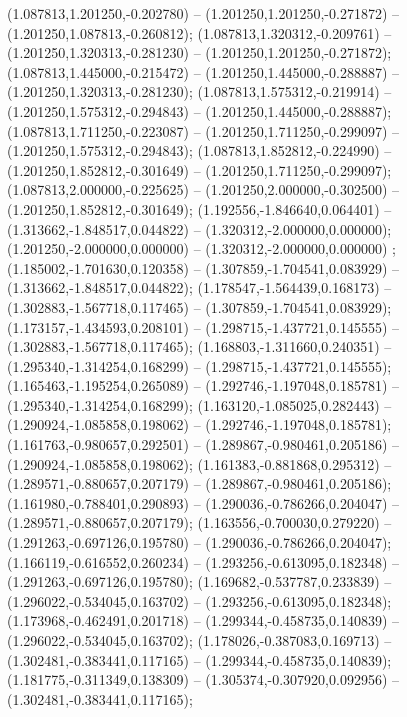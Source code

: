  (1.087813,1.201250,-0.202780) -- (1.201250,1.201250,-0.271872) -- (1.201250,1.087813,-0.260812);
 (1.087813,1.320312,-0.209761) -- (1.201250,1.320313,-0.281230) -- (1.201250,1.201250,-0.271872);
 (1.087813,1.445000,-0.215472) -- (1.201250,1.445000,-0.288887) -- (1.201250,1.320313,-0.281230);
 (1.087813,1.575312,-0.219914) -- (1.201250,1.575312,-0.294843) -- (1.201250,1.445000,-0.288887);
 (1.087813,1.711250,-0.223087) -- (1.201250,1.711250,-0.299097) -- (1.201250,1.575312,-0.294843);
 (1.087813,1.852812,-0.224990) -- (1.201250,1.852812,-0.301649) -- (1.201250,1.711250,-0.299097);
 (1.087813,2.000000,-0.225625) -- (1.201250,2.000000,-0.302500) -- (1.201250,1.852812,-0.301649);
 (1.192556,-1.846640,0.064401) -- (1.313662,-1.848517,0.044822) -- (1.320312,-2.000000,0.000000);
 (1.201250,-2.000000,0.000000) -- (1.320312,-2.000000,0.000000) ;
 (1.185002,-1.701630,0.120358) -- (1.307859,-1.704541,0.083929) -- (1.313662,-1.848517,0.044822);
 (1.178547,-1.564439,0.168173) -- (1.302883,-1.567718,0.117465) -- (1.307859,-1.704541,0.083929);
 (1.173157,-1.434593,0.208101) -- (1.298715,-1.437721,0.145555) -- (1.302883,-1.567718,0.117465);
 (1.168803,-1.311660,0.240351) -- (1.295340,-1.314254,0.168299) -- (1.298715,-1.437721,0.145555);
 (1.165463,-1.195254,0.265089) -- (1.292746,-1.197048,0.185781) -- (1.295340,-1.314254,0.168299);
 (1.163120,-1.085025,0.282443) -- (1.290924,-1.085858,0.198062) -- (1.292746,-1.197048,0.185781);
 (1.161763,-0.980657,0.292501) -- (1.289867,-0.980461,0.205186) -- (1.290924,-1.085858,0.198062);
 (1.161383,-0.881868,0.295312) -- (1.289571,-0.880657,0.207179) -- (1.289867,-0.980461,0.205186);
 (1.161980,-0.788401,0.290893) -- (1.290036,-0.786266,0.204047) -- (1.289571,-0.880657,0.207179);
 (1.163556,-0.700030,0.279220) -- (1.291263,-0.697126,0.195780) -- (1.290036,-0.786266,0.204047);
 (1.166119,-0.616552,0.260234) -- (1.293256,-0.613095,0.182348) -- (1.291263,-0.697126,0.195780);
 (1.169682,-0.537787,0.233839) -- (1.296022,-0.534045,0.163702) -- (1.293256,-0.613095,0.182348);
 (1.173968,-0.462491,0.201718) -- (1.299344,-0.458735,0.140839) -- (1.296022,-0.534045,0.163702);
 (1.178026,-0.387083,0.169713) -- (1.302481,-0.383441,0.117165) -- (1.299344,-0.458735,0.140839);
 (1.181775,-0.311349,0.138309) -- (1.305374,-0.307920,0.092956) -- (1.302481,-0.383441,0.117165);
